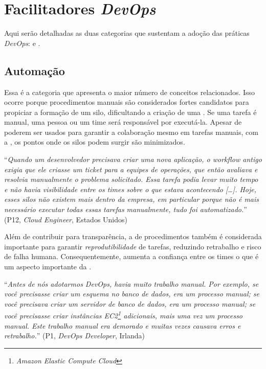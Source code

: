 \section{Facilitadores \emph{DevOps}}\label{secao_facilitadores}

Aqui serão detalhadas as duas categorias que sustentam a adoção das práticas
{\it DevOps}:  e .

\subsection{Automação} \label{ssec:automation}

Essa é a categoria que apresenta o maior número de conceitos relacionados. Isso
ocorre porque procedimentos manuais são considerados fortes candidatos para
propiciar a formação de um silo, dificultando a criação de uma \cc. Se uma tarefa
é manual, uma pessoa ou um time será responsável por executá-la. Apesar de
 poderem ser usados para garantir a
colaboração mesmo em tarefas manuais, com a , os pontos onde os
silos podem surgir são minimizados.

\begin{mq}
``\emph{Quando um desenvolvedor precisava criar uma nova aplicação, o workflow
antigo exigia que ele criasse um ticket para a equipes de operações, que então
avaliava e resolvia manualmente o problema solicitado. Essa tarefa podia levar
muito tempo e não havia visibilidade entre os times sobre o que estava
acontecendo [\ldots]. Hoje, esses silos não existem mais dentro da empresa,
em particular porque não é mais necessário executar todas essas tarefas
manualmente, tudo foi automatizado.}'' (P12, {\it Cloud Engineer}, Estados Unidos)
\end{mq}

Além de contribuir para transparência, a  de procedimentos
também é considerada importante para garantir \emph{reprodutibilidade} de
tarefas, reduzindo retrabalho e risco de falha humana. Consequentemente,
 aumenta a confiança entre os times o que é um aspecto importante
da \cc.

\begin{mq}
``\emph{Antes de nós adotarmos DevOps, havia muito trabalho manual. Por exemplo,
se você precisasse criar um esquema no banco de dados, era um processo manual;
se você precisava criar um servidor de banco de dados, era um processo manual;
se você precisasse criar instâncias EC2\footnote{{\it Amazon Elastic Compute Cloud}}
adicionais, mais uma vez um processo manual. Este trabalho manual era demorado
e muitas vezes causava erros e retrabalho.}'' (P1, {\it DevOps Developer}, Irlanda)
\end{mq}

